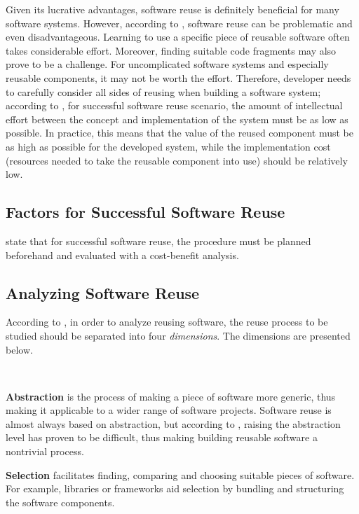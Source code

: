 Given its lucrative advantages, software reuse is definitely beneficial for many software systems. However, according to \citet{krueger_software_1992}, software reuse can be problematic and even disadvantageous. Learning to use a specific piece of reusable software often takes considerable effort. Moreover, finding suitable code fragments may also prove to be a challenge. For uncomplicated software systems and especially reusable components, it may not be worth the effort. Therefore, developer needs to carefully consider all sides of reusing when building a software system; according to \citet[chap.~1.3]{krueger_software_1992}, for successful software reuse scenario, the amount of intellectual effort between the concept and implementation of the system must be as low as possible. In practice, this means that the value of the reused component must be as high as possible for the developed system, while the implementation cost (resources needed to take the reusable component into use) should be relatively low. 

\subsection{Factors for Successful Software Reuse}
\citet{frakes_success_1994} state that for successful software reuse, the procedure must be planned beforehand and evaluated with a cost-benefit analysis.  

\subsection{Analyzing Software Reuse}
According to \citet{krueger_software_1992}, in order to analyze reusing software, the reuse process to be studied should be separated into four \emph{dimensions}. The dimensions are presented below.

~

\textbf{Abstraction} is the process of making a piece of software more generic, thus making it applicable to a wider range of software projects. Software reuse is almost always based on abstraction, but according to \citet{krueger_software_1992}, raising the abstraction level has proven to be difficult, thus making building reusable software a nontrivial process.\newline

\textbf{Selection} facilitates finding, comparing and choosing suitable pieces of software. For example, libraries or frameworks aid selection by bundling and structuring the software components.\newline


